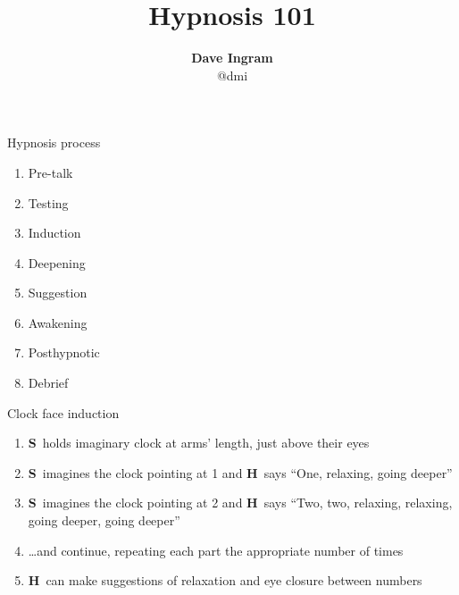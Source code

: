 \documentclass[style=groupspaces]{powerdot}
\title{Hypnosis 101}
\author{\textbf{Dave Ingram}\vspace*{6pt}\\\scriptsize @dmi}
\newcommand\hypS{\textcolor{blue!40!black}{\textbf{S}}}
\newcommand\hypH{\textcolor{green!60!black}{\textbf{H}}}
\newcommand\hl[2]{{\onslide*{#1}{\bfseries\color{red}}#2}}
\begin{document}
	\maketitle

  \begin{slide}{Hypnosis process}%
    \begin{center}
      \begin{minipage}{.35\linewidth}
        \Large
        \begin{enumerate}
          \item Pre-talk
          \item Testing
          \item \hl{2}{Induction}
          \item \hl{2}{Deepening}
          \item \hl{2}{Suggestion}
          \item \hl{2}{Awakening}
          \item \hl{2}{Posthypnotic}
          \item Debrief
        \end{enumerate}
      \end{minipage}
    \end{center}
  \end{slide}

  \begin{slide}{Clock face induction}%
    \begin{enumerate}
      \item \hypS\ holds imaginary clock at arms' length, just above their eyes
      \item \hypS\ imagines the clock pointing at 1 and \hypH\ says ``One, relaxing, going deeper''
      \item \hypS\ imagines the clock pointing at 2 and \hypH\ says ``Two, two, relaxing, relaxing, going deeper, going deeper''
      \item \ldots and continue, repeating each part the appropriate number of times
      \item \hypH\ can make suggestions of relaxation and eye closure between numbers
    \end{enumerate}
  \end{slide}
\end{document}
